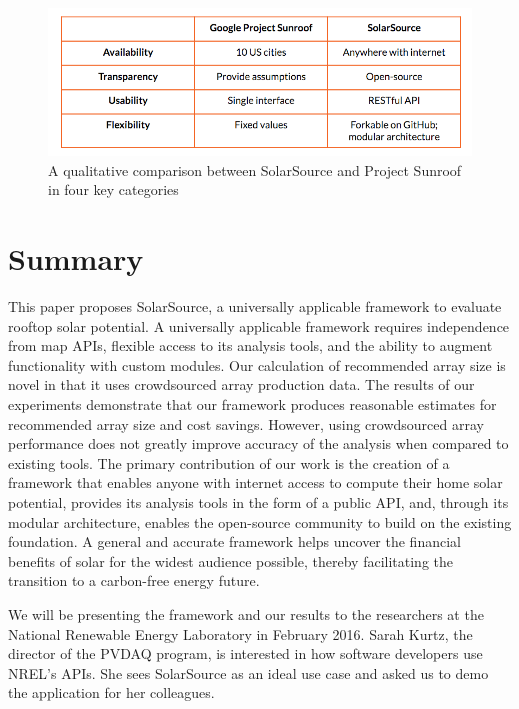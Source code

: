 \documentclass[pageno]{jpaper}
\begin{document}
\begin{figure}[h]
\begin{center}
\includegraphics [scale = 0.5] {qual-analysis}
\caption{A qualitative comparison between SolarSource and Project Sunroof in four key categories}
\label{fig:qual}
\end{center}
\end{figure}

\section{Summary}
This paper proposes SolarSource, a universally applicable framework to evaluate rooftop solar potential. A universally applicable framework requires independence from map APIs, flexible access to its analysis tools, and the ability to augment functionality with custom modules. Our calculation of recommended array size is novel in that it uses crowdsourced array production data. The results of our experiments demonstrate that our framework produces reasonable estimates for recommended array size and cost savings. However, using crowdsourced array performance does not greatly improve accuracy of the analysis when compared to existing tools. The primary contribution of our work is the creation of a framework that enables anyone with internet access to compute their home solar potential, provides its analysis tools in the form of a public API, and, through its modular architecture, enables the open-source community to build on the existing foundation. A general and accurate framework helps uncover the financial benefits of solar for the widest audience possible, thereby facilitating the transition to a carbon-free energy future.

We will be presenting the framework and our results to the researchers at the National Renewable Energy Laboratory in February 2016. Sarah Kurtz, the director of the PVDAQ program, is interested in how software developers use NREL's APIs. She sees SolarSource as an ideal use case and asked us to demo the application for her colleagues.
\end{document}
